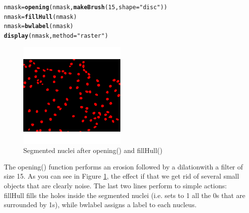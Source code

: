 \documentclass{article}\usepackage[]{graphicx}\usepackage[]{color}
\makeatletter
\newcommand{\hlnum}[1]{\textcolor[rgb]{0.686,0.059,0.569}{#1}}%
\newcommand{\hlstr}[1]{\textcolor[rgb]{0.192,0.494,0.8}{#1}}%
\newcommand{\hlstd}[1]{\textcolor[rgb]{0.345,0.345,0.345}{#1}}%
\newcommand{\hlkwb}[1]{\textcolor[rgb]{0.69,0.353,0.396}{#1}}%
\newcommand{\hlkwc}[1]{\textcolor[rgb]{0.333,0.667,0.333}{#1}}%
\newcommand{\hlkwd}[1]{\textcolor[rgb]{0.737,0.353,0.396}{\textbf{#1}}}%
\newenvironment{kframe}{%
 \def\at@end@of@kframe{}%
 \ifinner\ifhmode%
  \def\at@end@of@kframe{\end{minipage}}%
  \begin{minipage}{\columnwidth}%
 \fi\fi%
 \def\FrameCommand##1{\hskip\@totalleftmargin \hskip-\fboxsep
 \colorbox{shadecolor}{##1}\hskip-\fboxsep
     \hskip-\linewidth \hskip-\@totalleftmargin \hskip\columnwidth}%
 \MakeFramed {\advance\hsize-\width
   \@totalleftmargin\z@ \linewidth\hsize
   \@setminipage}}%
 {\par\unskip\endMakeFramed%
 \at@end@of@kframe}
\newenvironment{knitrout}{}{} %
\makeatother
\begin{document}
\begin{knitrout}
\color{fgcolor}\begin{kframe}
\begin{alltt}
\hlstd{nmask} \hlkwb{=} \hlkwd{opening}\hlstd{(nmask,} \hlkwd{makeBrush}\hlstd{(}\hlnum{15}\hlstd{,} \hlkwc{shape}\hlstd{=}\hlstr{"disc"}\hlstd{))}
\hlstd{nmask} \hlkwb{=} \hlkwd{fillHull}\hlstd{(nmask)}
\hlstd{nmask} \hlkwb{=} \hlkwd{bwlabel}\hlstd{(nmask)}
\hlkwd{display}\hlstd{(nmask,} \hlkwc{method}\hlstd{=}\hlstr{"raster"}\hlstd{)}
\end{alltt}
\end{kframe}\begin{figure}

{\centering \includegraphics[width=200px]{knit_figure/figopening-1} 

}

\caption[Segmented nuclei after opening() and fillHull()]{Segmented nuclei after opening() and fillHull()}\label{fig:opening}
\end{figure}


\end{knitrout}
The opening() function performs an erosion followed by a dilation\footnotemark[1] with a filter of size 15. As you can see in Figure \ref{fig:opening}, the effect if that we get rid of several small objects that are clearly noise.
The last two lines perform to simple actions: fillHull fills the holes inside the segmented nuclei (i.e. sets to 1 all the 0s that are surrounded by 1s), while bwlabel assigns a label to each nucleus.

\end{document}
